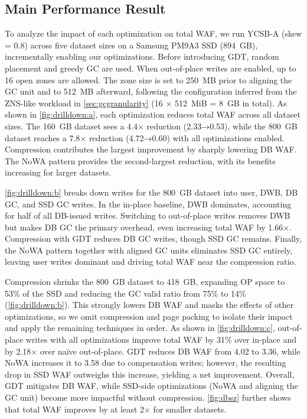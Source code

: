 \subsection{Main Performance Result}\label{sec:mainperfresult}
To analyze the impact of each optimization on total WAF, we run YCSB-A (skew = 0.8) across five dataset sizes on a Samsung PM9A3 SSD (894~GB), 
incrementally enabling our optimizations.  
Before introducing GDT, random placement and greedy GC are used.  
When out-of-place writes are enabled, up to 16 open zones are allowed.
The zone size is set to 250~MB prior to aligning the GC unit and to 512~MB afterward, following the configuration inferred from the ZNS-like workload in \cref{sec:gcgranularity} (16 $\times$ 512~MiB = 8~GB in total).
As shown in \cref{fig:drilldown:a}, each optimization reduces total WAF across all dataset sizes.
The 160~GB dataset sees a 4.4× reduction (2.33→0.53), while the 800~GB dataset reaches a 7.8× reduction (4.72→0.60) with all optimizations enabled.
Compression contributes the largest improvement by sharply lowering DB WAF.
The NoWA pattern provides the second-largest reduction, with its benefits increasing for larger datasets.

\cref{fig:drilldown:b} breaks down writes for the 800~GB dataset into user, DWB, DB GC, and SSD GC writes.
In the in-place baseline, DWB dominates, accounting for half of all DB-issued writes.
Switching to out-of-place writes removes DWB but makes DB GC the primary overhead, even increasing total WAF by 1.66×.
Compression with GDT reduces DB GC writes, though SSD GC remains.
Finally, the NoWA pattern together with aligned GC units eliminates SSD GC entirely, leaving user writes dominant and driving total WAF near the compression ratio.


Compression shrinks the 800~GB dataset to 418~GB, expanding OP space to 53\% of the SSD and reducing the GC valid ratio from 75\% to 14\% (\cref{fig:drilldown:b}).  
This strongly lowers DB WAF and masks the effects of other optimizations, so we omit compression and page packing to isolate their impact and apply the remaining techniques in order.  
As shown in \cref{fig:drilldown:c}, out-of-place writes with all optimizations improve total WAF by 31\% over in-place and by 2.18× over naïve out-of-place.  
GDT reduces DB WAF from 4.02 to 3.36, while NoWA increases it to 3.58 due to compensation writes; however, the resulting drop in SSD WAF outweighs this increase, yielding a net improvement.  
Overall, GDT mitigates DB WAF, while SSD-side optimizations (NoWA and aligning the GC unit) become more impactful without compression.  
\cref{fig:dbsz} further shows that total WAF improves by at least 2× for smaller datasets.

